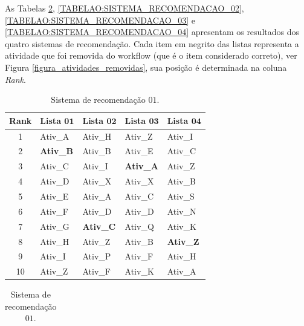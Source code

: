 As Tabelas \ref{TABELAO:SISTEMA_RECOMENDACAO_01}, \ref{TABELAO:SISTEMA_RECOMENDACAO_02}, \ref{TABELAO:SISTEMA_RECOMENDACAO_03} e \ref{TABELAO:SISTEMA_RECOMENDACAO_04} apresentam os resultados dos quatro sistemas de recomendação. Cada item em negrito das listas representa a atividade que foi removida do workflow (que é o item considerado correto), ver Figura \ref{figura_atividades_removidas}, sua posição é determinada na coluna \emph{Rank}.
\begin{table}[!htbp]
\tiny
 \caption{Exemplo de recomendações de atividades usando quatro sistemas de recomendação.}
   \begin{subtable}{.5\linewidth}
    	\centering
   		\begin{tabular}{cllll} \hline 
   		\textbf{Rank} & \textbf{Lista} \(\mathbf{01}\) & \textbf{Lista} \(\mathbf{02}\) & \textbf{Lista} \(\mathbf{03}\) & \textbf{Lista} \(\mathbf{04}\) \\ \hline 
   		1                & Ativ\_A	     		& Ativ\_H    			& Ativ\_Z   		& Ativ\_I    		\\
   		2                & \textbf{Ativ\_B}		& Ativ\_B   			& Ativ\_E   		& Ativ\_C 			\\
   		3                & Ativ\_C    			& Ativ\_I    			& \textbf{Ativ\_A}  & Ativ\_Z  			\\
   		4                & Ativ\_D   			& Ativ\_X    			& Ativ\_X    		& Ativ\_B			\\
   		5                & Ativ\_E   			& Ativ\_A			 	& Ativ\_C    		& Ativ\_S			\\
   		6                & Ativ\_F   			& Ativ\_D    			& Ativ\_D    		& Ativ\_N			\\
   		7                & Ativ\_G   			& \textbf{Ativ\_C}  	& Ativ\_Q    		& Ativ\_K			\\
   		8                & Ativ\_H   			& Ativ\_Z    			& Ativ\_B   		& \textbf{Ativ\_Z}	\\
   		9                & Ativ\_I    			& Ativ\_P   			& Ativ\_F   		& Ativ\_H			\\
   		10               & Ativ\_Z   			& Ativ\_F    			& Ativ\_K    		& Ativ\_A			\\ \hline
   		\end{tabular}
   		\caption{Sistema de recomendação \(01\).}   
   		\label{TABELAO:SISTEMA_RECOMENDACAO_01}		
   \end{subtable}%
   \begin{subtable}{.5\linewidth}
   		\centering
   		\begin{tabular}{cllll} \hline 

\end{tabular}
\end{subtable}
\end{table}
